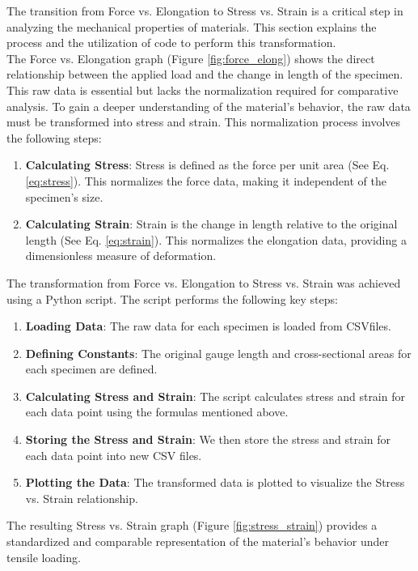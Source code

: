 \documentclass{article}
\begin{document}
 The transition from Force vs. Elongation to Stress vs. Strain is a critical step in analyzing the mechanical properties of materials. This section explains the process and the utilization of code to perform this transformation.\\[8pt]
 The Force vs. Elongation graph (Figure \ref{fig:force_elong}) shows the direct relationship between the applied load and the change in length of the specimen. This raw data is essential but lacks the normalization required for comparative analysis. To gain a deeper understanding of the material's behavior, the raw data must be transformed into stress and strain. This normalization process involves the following steps:
 \begin{enumerate}
     \item \textbf{Calculating Stress}: Stress is defined as the force per unit area (See Eq. \ref{eq:stress}). This normalizes the force data, making it independent of the specimen's size.
     \item \textbf{Calculating Strain}: Strain is the change in length relative to the original length (See Eq. \ref{eq:strain}). This normalizes the elongation data, providing a dimensionless measure of deformation.
 \end{enumerate}
 The transformation from Force vs. Elongation to Stress vs. Strain was achieved using a Python script. The script performs the following key steps:
 \begin{enumerate}
     \item \textbf{Loading Data}: The raw data for each specimen is loaded from CSV\footnotemark files.
     \item \textbf{Defining Constants}: The original gauge length and cross-sectional areas for each specimen are defined.
     \item \textbf{Calculating Stress and Strain}: The script calculates stress and strain for each data point using the formulas mentioned above.
     \item \textbf{Storing the Stress and Strain}: We then store the stress and strain for each data point into new CSV files.
     \item \textbf{Plotting the Data}: The transformed data is plotted to visualize the Stress vs. Strain relationship.
 \end{enumerate}
 The resulting Stress vs. Strain graph (Figure \ref{fig:stress_strain}) provides a standardized and comparable representation of the material's behavior under tensile loading.\\\noindent{}    \newpage
\end{document}
